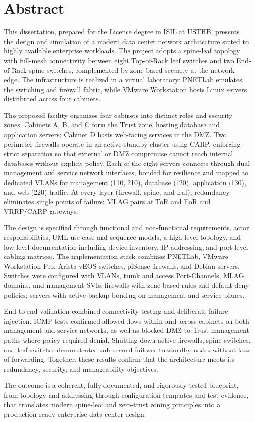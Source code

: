 \chapter*{Abstract}

\begingroup
\small
\linespread{1.05}\selectfont
\setlength{\parskip}{0.3em}

This dissertation, prepared for the Licence degree in ISIL at USTHB, presents the design and simulation of a modern data center network architecture suited to highly available enterprise workloads. The project adopts a spine-leaf topology with full-mesh connectivity between eight Top-of-Rack leaf switches and two End-of-Rack spine switches, complemented by zone-based security at the network edge. The infrastructure is realized in a virtual laboratory: PNETLab emulates the switching and firewall fabric, while VMware Workstation hosts Linux servers distributed across four cabinets.

The proposed facility organizes four cabinets into distinct roles and security zones. Cabinets A, B, and C form the Trust zone, hosting database and application servers; Cabinet D hosts web-facing services in the DMZ. Two perimeter firewalls operate in an active-standby cluster using CARP, enforcing strict separation so that external or DMZ compromise cannot reach internal databases without explicit policy. Each of the eight servers connects through dual management and service network interfaces, bonded for resilience and mapped to dedicated VLANs for management (110, 210), database (120), application (130), and web (220) traffic. At every layer (firewall, spine, and leaf), redundancy eliminates single points of failure: MLAG pairs at ToR and EoR and VRRP/CARP gateways.

The design is specified through functional and non-functional requirements, actor responsibilities, UML use-case and sequence models, a high-level topology, and low-level documentation including device inventory, IP addressing, and port-level cabling matrices. The implementation stack combines PNETLab, VMware Workstation Pro, Arista vEOS switches, pfSense firewalls, and Debian servers. Switches were configured with VLANs, trunk and access Port-Channels, MLAG domains, and management SVIs; firewalls with zone-based rules and default-deny policies; servers with active-backup bonding on management and service planes.

End-to-end validation combined connectivity testing and deliberate failure injection. ICMP tests confirmed allowed flows within and across cabinets on both management and service networks, as well as blocked DMZ-to-Trust management paths where policy required denial. Shutting down active firewalls, spine switches, and leaf switches demonstrated sub-second failover to standby nodes without loss of forwarding. Together, these results confirm that the architecture meets its redundancy, security, and manageability objectives.

The outcome is a coherent, fully documented, and rigorously tested blueprint, from topology and addressing through configuration templates and test evidence, that translates modern spine-leaf and zero-trust zoning principles into a production-ready enterprise data center design.

\endgroup
